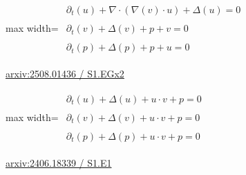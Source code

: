 \documentclass[10pt,a4paper]{article}
\begin{document}
\begin{minipage}{\linewidth}
\begin{center}\begin{adjustbox}{max width=\linewidth}$\displaystyle\begin{gathered}\begin{gathered}\partial_{t}(u)+\nabla\cdot(\nabla(v)\cdot u)+\Delta(u)=0\end{gathered}\\[5pt]\begin{gathered}\partial_{t}(v)+\Delta(v)+p+v=0\end{gathered}\\[5pt]\begin{gathered}\partial_{t}(p)+\Delta(p)+p+u=0\end{gathered}\end{gathered}$\end{adjustbox}\end{center}
{\small \href{https://arxiv.org/html/2508.01436#S1.EGx2}{arxiv:2508.01436 / S1.EGx2}}\par
\end{minipage}\par\vspace{7mm}

\begin{minipage}{\linewidth}
\begin{center}\begin{adjustbox}{max width=\linewidth}$\displaystyle\begin{gathered}\begin{gathered}\partial_{t}(u)+\Delta(u)+u\cdot v+p=0\end{gathered}\\[5pt]\begin{gathered}\partial_{t}(v)+\Delta(v)+u\cdot v+p=0\end{gathered}\\[5pt]\begin{gathered}\partial_{t}(p)+\Delta(p)+u\cdot v+p=0\end{gathered}\end{gathered}$\end{adjustbox}\end{center}
{\small \href{https://arxiv.org/html/2406.18339#S1.E1}{arxiv:2406.18339 / S1.E1}}\par
\end{minipage}\par\vspace{7mm}
\end{document}
